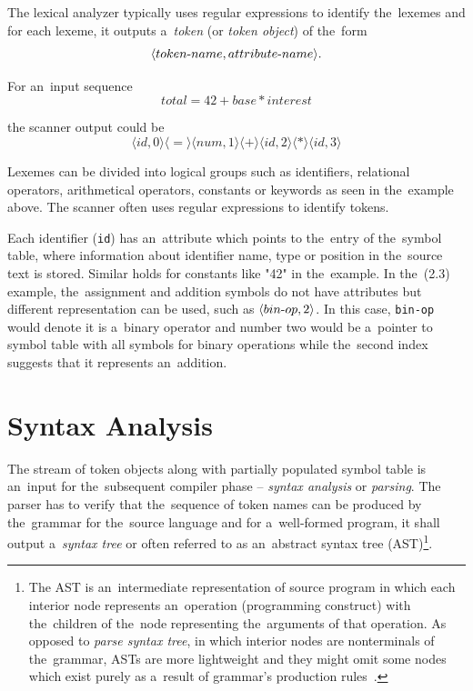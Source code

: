 \documentclass[
  digital, %
  table,   %
  lof,     %
  lot,     %
  oneside,
]{fithesis3}
\begin{document}
The lexical analyzer typically uses regular expressions to identify the~lexemes and for each lexeme, it outputs a~\textit{token} (or \textit{token object}) of the~form 
\begin{equation}
  \langle token \textnormal{-} name, attribute \textnormal{-} name \rangle \textnormal{.}
\end{equation}

\noindent
For an~input sequence 
\begin{equation}
  total = 42 + base * interest
\end{equation}
 
the scanner output could be
\begin{equation}
  \langle id, 0 \rangle 
  \langle = \rangle 
  \langle num, 1 \rangle 
  \langle + \rangle 
  \langle id, 2 \rangle 
  \langle * \rangle 
  \langle id, 3 \rangle
\end{equation}

Lexemes can be divided into logical groups such as identifiers, relational operators, arithmetical operators, constants or keywords as seen in the~example above. The scanner often uses regular expressions to identify tokens.

Each identifier (\texttt{id}) has an~attribute which points to the~entry of the~symbol table, where information about identifier name, type or position in the~source text is stored. Similar holds for constants like "42" in the~example. In the~(2.3) example, the~assignment and addition symbols do not have attributes but different representation can be used, such as $ \langle bin \textnormal{-} op, 2 \rangle $. In this case, \texttt{bin-op} would denote it is a~binary operator and number two would be a~pointer to symbol table with all symbols for binary operations while the~second index suggests that it represents an~addition.

  \section{Syntax Analysis}
The stream of token objects along with partially populated symbol table is an~input for the~subsequent compiler phase -- \textit{syntax analysis} or \textit{parsing}. The parser has to verify that the~sequence of token names can be produced by the~grammar for the~source language and for a~well-formed program, it shall output a~\textit{syntax tree} or often referred to as an~abstract syntax tree (AST)\footnote{The AST is an~intermediate representation of source program in which each interior node represents an~operation (programming construct) with the~children of the~node representing the~arguments of that operation. As opposed to \textit{parse syntax tree}, in which interior nodes are nonterminals of the~grammar, ASTs are more lightweight and they might omit some nodes which exist purely as a~result of grammar's production rules~\cite{secure-programming-with-sca}.}.
\end{document}
